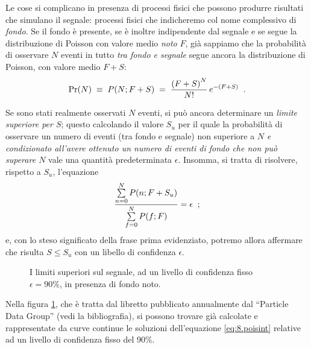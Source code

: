 Le cose si complicano in presenza di processi fisici che
possono produrre risultati che simulano il segnale: processi
fisici che indicheremo col nome complessivo di \emph{fondo}.
Se il fondo \`e presente, se \`e inoltre indipendente dal
segnale e se segue la distribuzione di Poisson con valore
medio \emph{noto} $F$, gi\`a sappiamo che la probabilit\`a
di osservare $N$ eventi in tutto \emph{tra fondo e segnale}
segue ancora la distribuzione di Poisson, con valore medio
$F+S$:
\begin{equation*}
  \Pr(N) \; \equiv \; P(N; F + S) \; = \; \frac{\left( F + S
    \right)^N}{N!} \, e^{- \left( F + S \right)} \;\; .
\end{equation*}

Se sono stati realmente osservati $N$ eventi, si pu\`o
ancora determinare un \emph{limite superiore per $S$};
questo calcolando il valore $S_u$ per il quale la
probabilit\`a di osservare un numero di eventi (tra fondo e
segnale) non superiore a $N$ \emph{e condizionato all'avere
  ottenuto un numero di eventi di fondo che non pu\`o
  superare $N$} vale una quantit\`a predeterminata
$\epsilon$.  Insomma, si tratta di risolvere, rispetto a
$S_u$, l'equazione
\begin{equation} \label{eq:8.poisint}
  \frac{\sum\limits_{n=0}^N P(n; F +
    S_u)}{\sum\limits_{f=0}^N P(f; F)} = \epsilon \;\; ;
\end{equation}
e, con lo steso significato della frase prima evidenziato,
potremo allora affermare che risulta $S \leq S_u$ con un
libello di confidenza $\epsilon$.
\begin{figure}[htbp]
  \vspace*{2ex}
  \begin{center}  \end{center}
  \caption[Limiti superiori sul segnale in presenza di fondo
    noto]{I limiti superiori sul segnale, ad un livello di
    confidenza fisso $\epsilon = 90\%$, in presenza di fondo noto.}
  \label{fig:8.poisint}
\end{figure}

Nella figura \ref{fig:8.poisint}, che \`e tratta dal
libretto pubblicato annualmente dal ``Particle Data Group''
(vedi la bibliografia), si possono trovare gi\`a
calcolate e rappresentate da curve continue le soluzioni
dell'equazione \eqref{eq:8.poisint} relative ad un livello
di confidenza fisso del 90\%.

